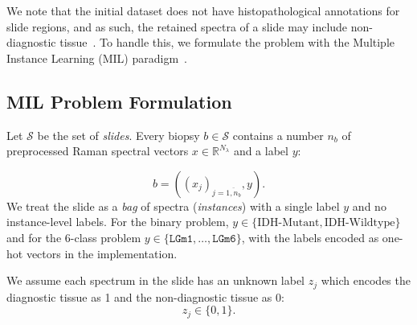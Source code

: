 \documentclass[12pt]{article}
\theoremstyle{paper}
\begin{document}

We note that the initial dataset does not have histopathological annotations for slide regions, and as such, the retained spectra of a slide may include non-diagnostic tissue~\cite{apollonov2024raman}. To handle this, we formulate the problem with the Multiple Instance Learning (MIL) paradigm~\cite{dietterich1997solving, waqas2024exploring}. 

\subsection{MIL Problem Formulation}\label{subsec:MIL}

Let $\mathcal{S}$ be the set of \textit{slides}. Every biopsy $b \in \mathcal{S}$ contains a number $n_b$ of preprocessed Raman spectral vectors $x \in \mathbb{R}^{N_\lambda}$ and a label $y$: 

\begin{equation}
    b = \left( 
\left( 
x_{j} \right)_{j=\overline{1,n_{b}}},y 
\right).
\end{equation} We treat the slide as a \textit{bag} of spectra (\textit{instances}) with a single label $y$ and no instance-level labels. For the binary problem, $y \in \{\text{IDH-Mutant}, \text{IDH-Wildtype} \}$ and for the 6-class problem $y \in \{\texttt{LGm1}, \ldots,  \texttt{LGm6}\}$, with the labels encoded as one-hot vectors in the implementation. 

We assume each spectrum in the slide has an unknown label $z_{j}$ which encodes the diagnostic tissue as 1 and the non-diagnostic tissue as 0: 
\begin{equation}
    z_{j} \in \{0,1\}.
\end{equation}

\end{document}
